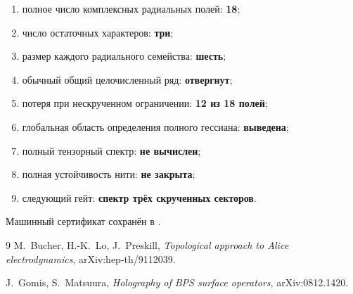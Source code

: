 \begin{protocol}
\begin{enumerate}
 \item полное число комплексных радиальных полей: \textbf{18};
 \item число остаточных характеров: \textbf{три};
 \item размер каждого радиального семейства: \textbf{шесть};
 \item обычный общий целочисленный ряд: \textbf{отвергнут};
 \item потеря при нескрученном ограничении: \textbf{12 из 18 полей};
 \item глобальная область определения полного гессиана: \textbf{выведена};
 \item полный тензорный спектр: \textbf{не вычислен};
 \item полная устойчивость нити: \textbf{не закрыта};
 \item следующий гейт: \textbf{спектр трёх скрученных секторов}.
\end{enumerate}
\end{protocol}

Машинный сертификат сохранён в
.

\begin{thebibliography}{9}
M.~Bucher, H.-K.~Lo, J.~Preskill,
\emph{Topological approach to Alice electrodynamics},
arXiv:hep-th/9112039.

J.~Gomis, S.~Matsuura,
\emph{Holography of BPS surface operators},
arXiv:0812.1420.
\end{thebibliography}